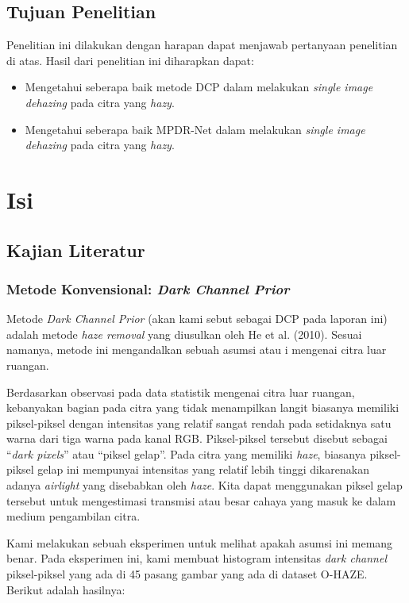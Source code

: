 \documentclass[11pt, a4paper, final]{report}
\begin{document}
\section{Tujuan Penelitian}

Penelitian ini dilakukan dengan harapan dapat menjawab pertanyaan penelitian di atas. Hasil dari penelitian ini diharapkan dapat:

\begin{itemize}
    \item Mengetahui seberapa baik metode DCP dalam melakukan \textit{single image dehazing} pada citra yang \textit{hazy}.
    \item Mengetahui seberapa baik MPDR-Net dalam melakukan \textit{single image dehazing} pada citra yang \textit{hazy}.
\end{itemize}

\chapter{Isi}

\section{Kajian Literatur}

\subsection{Metode Konvensional: \textit{Dark Channel Prior}}

Metode \textit{Dark Channel Prior} (akan kami sebut sebagai DCP pada laporan ini) adalah metode \textit{haze removal} yang diusulkan oleh He et al. (2010). Sesuai namanya, metode ini mengandalkan sebuah asumsi atau i mengenai citra luar ruangan. 

Berdasarkan observasi pada data statistik mengenai citra luar ruangan, kebanyakan bagian pada citra yang tidak menampilkan langit biasanya memiliki piksel-piksel dengan intensitas yang relatif sangat rendah pada setidaknya satu warna dari tiga warna pada kanal RGB. Piksel-piksel tersebut disebut sebagai “\textit{dark pixels}” atau “piksel gelap”. Pada citra yang memiliki \textit{haze}, biasanya piksel-piksel gelap ini mempunyai intensitas yang relatif lebih tinggi dikarenakan adanya \textit{airlight} yang disebabkan oleh \textit{haze}. Kita dapat menggunakan piksel gelap tersebut untuk mengestimasi transmisi atau besar cahaya yang masuk ke dalam medium pengambilan citra.

Kami melakukan sebuah eksperimen untuk melihat apakah asumsi ini memang benar. Pada eksperimen ini, kami membuat histogram intensitas \textit{dark channel} piksel-piksel yang ada di 45 pasang gambar yang ada di dataset O-HAZE. Berikut adalah hasilnya:
\end{document}
